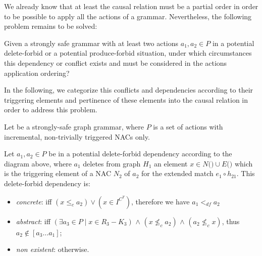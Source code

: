 We already know that at least the causal relation must be a partial order in order to be possible to apply all the actions of a grammar. Nevertheless, the following problem remains to be solved:

\begin{intuition}
  Given a strongly safe grammar \doublyTypedGraphGrammarCore{} with at least two actions $a_1, a_2 \in P$ in a potential delete-forbid or a potential produce-forbid situation, under which circumstances this dependency or conflict exists and must be considered in the actions application ordering?
\end{intuition}

In the following, we categorize this conflicts and dependencies according to their triggering elements and pertinence of these elements into the causal relation in order to address this problem.

\begin{definition}\label{def:delete-forbid-strong} Let \doublyTypedGraphGrammarCore{} be a strongly-safe graph grammar, where $P$ is a set of actions with incremental, non-trivially triggered NACs only.

\hfill

  Let $a_1, a_2 \in P$ be in a potential delete-forbid dependency according to the diagram above, where $a_1$ deletes from graph $H_1$ an element $x \in N($\coreGraph$) \cup E($\coreGraph$)$ which is the triggering element of a NAC $N_2$ of $a_2$ for the extended match $e_1 \circ h_{21}$. This delete-forbid dependency is:

\begin{itemize}
  \item \emph{concrete}: iff $(x \leq_c a_2) \lor (x \in I^{C^T})$, therefore we have $a_1 <_{df} a_2$
  \item \emph{abstract}: iff $(\exists a_3 \in P \mid x \in R_3 - K_3)$ $\land$ $(x \not\leq_c a_2)$ $\land$ $(a_2 \not\leq_c x)$, thus $a_2 \not\in [a_3 \ldots a_1]$;
  \item \emph{non existent}: otherwise.
\end{itemize}

\end{definition}

